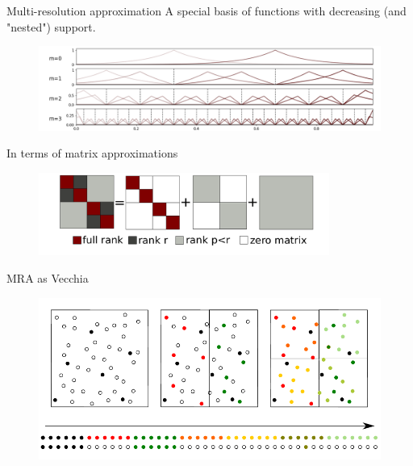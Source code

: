 \documentclass{beamer}
\begin{document}
\begin{frame}{Multi-resolution approximation}
    A special basis of functions with decreasing (and "nested") support.
    \begin{figure}
        \centering
        \includegraphics[width=1.0\textwidth]{plots/basisf-prior.png}
    \end{figure}
    \vfill
    In terms of matrix approximations
    \begin{figure}
        \centering
        \includegraphics[width=0.85\textwidth]{plots/2LHODLRsum.pdf}
    \end{figure}
\end{frame}


\begin{frame}{MRA as Vecchia}
\begin{figure}
        \centering
        \includegraphics[width=\textwidth]{plots/domain.pdf}
\end{figure}
\end{frame}
\end{document}
